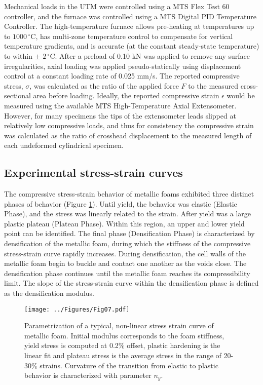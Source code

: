 \documentclass[review]{elsarticle}
\begin{document}
Mechanical loads in the UTM were controlled using a MTS Flex Test 60 controller, and the furnace was controlled using a MTS Digital PID Temperature Controller. The high-temperature furnace allows pre-heating at temperatures up to $1000\,^{\circ}\mathrm{C}$, has multi-zone temperature control to compensate for vertical temperature gradients, and is accurate (at the constant steady-state temperature) to within $\pm$ $2\,^{\circ}\mathrm{C}$. After a preload of 0.10 kN was applied to remove any surface irregularities, axial loading was applied pseudo-statically using displacement control at a constant loading rate of 0.025 mm/s. The reported compressive stress, $\sigma$, was calculated as the ratio of the applied force $F$ to the measured cross-sectional area before loading. Ideally, the reported compressive strain $\epsilon$ would be measured using the available MTS High-Temperature Axial Extensometer. However, for many specimens the tips of the extensometer leads slipped at relatively low compressive loads, and thus for consistency the compressive strain was calculated as the ratio of crosshead displacement to the measured length of each undeformed cylindrical specimen.


\subsection{Experimental stress-strain curves}

The compressive stress-strain behavior of metallic foams exhibited three distinct phases of behavior (Figure \ref{fig:MetFoaBeh}). Until yield, the behavior was elastic (Elastic Phase), and the stress was linearly related to the strain. After yield was a large plastic plateau (Plateau Phase). Within this region, an upper and lower yield point can be identified. The final phase (Densification Phase) is characterized by densification of the metallic foam, during which the stiffness of the compressive stress-strain curve rapidly increases. During densification, the cell walls of the metallic foam begin to buckle and contact one another as the voids close. The densification phase continues until the metallic foam reaches its compressibility limit. The slope of the stress-strain curve within the densification phase is defined as the densification modulus.

\begin{figure}[htbp]
	\begin{center}
		\texttt{[image: ../Figures/Fig07.pdf]}
		\caption{Parametrization of a typical, non-linear stress strain curve of metallic foam. Initial modulus corresponds to the foam stiffness, yield stress is computed at 0.2\% offset, plastic hardening is the linear fit and plateau stress is the average stress in the range of 20-30\% strains. Curvature of the transition from elastic to plastic behavior is characterized with parameter $n_y$.}
		\label{fig:MetFoaBeh}
	\end{center}
\end{figure}
\end{document}
